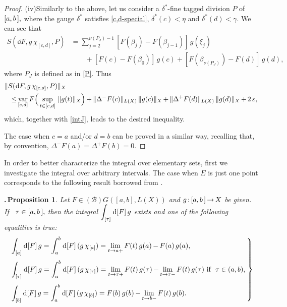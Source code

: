 \documentclass[12pt,twoside]{article}
\numberwithin{equation}{section}
\theoremstyle{plain}
\newtheorem{proposition}[theorem]{\hskip-1mm.\,Proposition}
\theoremstyle{definition}
\DeclareMathOperator{\var}{var}
\begin{document}
{\begin{proof}
\skipaline

\noindent(iv)\quad Similarly to the above, let us consider a $\delta^*$-fine tagged division $P$
of $[a,b\,],$ where the gauge $\delta^*$ satisfies \eqref{c,d-special}, $\delta^*(c)<\eta$
and $\delta^*(d)<\gamma.$ We can see that
\[
\begin{split}
   S(\dd F,g\,\chi_{[c,d]},P)
   &=\sum_{j=2}^{\nu(P_J)-1}[F(\beta_j)-F(\beta_{j-1})]\,g(\xi_j)
  \\
   &\qquad +[F(c)-F(\beta_0)]\,g(c)+[F(\beta_{\nu(P_J)})-F(d)]\,g(d),
\end{split}
\]
where $P_J$ is defined as in \eqref{P}. Thus
\[
\begin{split}
    &\|S(\dd F,g\,\chi_{[c,d]},P)\|_X
  \\&\quad
     {\le}\var_{[c,d]}F\Big(\sup_{t\in [c,d]}\,\|g(t)\|_X\Big)
       \,{+}\,\|\Delta^-F(c)\|_{L(X)}\,\|g(c)\|_X
       \,{+}\,\|\Delta^+F(d)\|_{L(X)}\,\|g(d)\|_X
       \,{+}\,2\,\eps,
\end{split}
\]
which, together with \eqref{intJ}, leads to the desired inequality.

\smallskip

The case when $c=a$ and/or $d=b$ can be proved in a similar way, recalling that,
by convention, $\Delta^-F(a)=\Delta^+F(b)=0.$
\end{proof}

\smallskip

In order to better characterize the integral over elementary sets, first we investigate
the integral over arbitrary intervals. The case when $E$ is just one point corresponds
to the following result borrowed from \cite[Lemma 12]{Sch1}.

\smallskip

\begin{proposition}\label{prop-point}
Let $F\in(\mathcal{B})G([a,b],L(X))$ and $g\,{:}\,[a,b\,]\,{\to}\,X$ be given. If
\ $\tau\in[a,b\,],$ then the integral $\displaystyle\int_{[\tau]}\hskip0.2mm\mbox{\rm d}[F]\,g$ exists and one
of the following equalities is true:
\begin{equation}\label{point}\hskip-1mm
  \left.\begin{array}{l}\dis
    \int_{[a]}\dd[F]\,g=\int_a^b\dd[F]\,(g\,\chi_{[a]})
    =\lim_{t\to a+}F(t)\,g(a)\,{-}\,F(a)\,g(a),
   \\[5mm]\dis
    \int_{[\tau]}\dd[F]\,g=\int_a^b\dd[F]\,(g\,\chi_{[\tau]})
    =\lim_{t\to\tau+}F(t)\,g(\tau)\,{-}\lim_{t\to\tau-}F(t)\,g(\tau)
    \mbox{\ if \ } \tau\in(a,b),
   \\[5mm]\dis
    \int_{[b]}\dd[F]\,g=\int_a^b\dd[F]\,(g\,\chi_{[b]})
    =F(b)\,g(b)\,{-}\lim_{t\to b-}F(t)\,g(b).
\end{array}\hskip-1mm\right\}
\end{equation}
\end{proposition}

}
\end{document}
